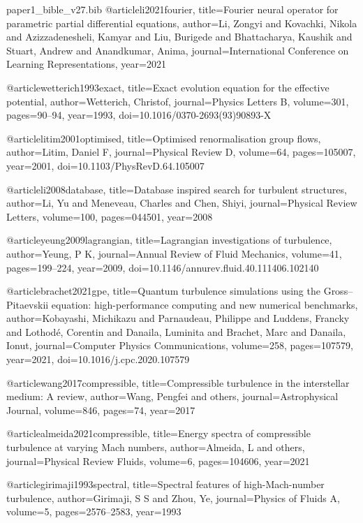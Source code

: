 \begin{filecontents}[overwrite]{paper1_bible_v27.bib}
@article{li2021fourier,
  title={Fourier neural operator for parametric partial differential equations},
  author={Li, Zongyi and Kovachki, Nikola and Azizzadenesheli, Kamyar and Liu, Burigede and Bhattacharya, Kaushik and Stuart, Andrew and Anandkumar, Anima},
  journal={International Conference on Learning Representations},
  year={2021}
}

@article{wetterich1993exact,
  title={Exact evolution equation for the effective potential},
  author={Wetterich, Christof},
  journal={Physics Letters B},
  volume={301},
  pages={90--94},
  year={1993},
  doi={10.1016/0370-2693(93)90893-X}
}

@article{litim2001optimised,
  title={Optimised renormalisation group flows},
  author={Litim, Daniel F},
  journal={Physical Review D},
  volume={64},
  pages={105007},
  year={2001},
  doi={10.1103/PhysRevD.64.105007}
}

@article{li2008database,
  title={Database inspired search for turbulent structures},
  author={Li, Yu and Meneveau, Charles and Chen, Shiyi},
  journal={Physical Review Letters},
  volume={100},
  pages={044501},
  year={2008}
}

@article{yeung2009lagrangian,
  title={Lagrangian investigations of turbulence},
  author={Yeung, P K},
  journal={Annual Review of Fluid Mechanics},
  volume={41},
  pages={199--224},
  year={2009},
  doi={10.1146/annurev.fluid.40.111406.102140}
}

@article{brachet2021gpe,
  title={Quantum turbulence simulations using the {G}ross--{P}itaevskii equation: high-performance computing and new numerical benchmarks},
  author={Kobayashi, Michikazu and Parnaudeau, Philippe and Luddens, Francky and Lothod{\'e}, Corentin and Danaila, Luminita and Brachet, Marc and Danaila, Ionut},
  journal={Computer Physics Communications},
  volume={258},
  pages={107579},
  year={2021},
  doi={10.1016/j.cpc.2020.107579}
}

@article{wang2017compressible,
  title={Compressible turbulence in the interstellar medium: {A} review},
  author={Wang, Pengfei and others},
  journal={Astrophysical Journal},
  volume={846},
  pages={74},
  year={2017}
}

@article{almeida2021compressible,
  title={Energy spectra of compressible turbulence at varying {M}ach numbers},
  author={Almeida, L and others},
  journal={Physical Review Fluids},
  volume={6},
  pages={104606},
  year={2021}
}

@article{girimaji1993spectral,
  title={Spectral features of high-{M}ach-number turbulence},
  author={Girimaji, S S and Zhou, Ye},
  journal={Physics of Fluids A},
  volume={5},
  pages={2576--2583},
  year={1993}
}


\end{filecontents}
